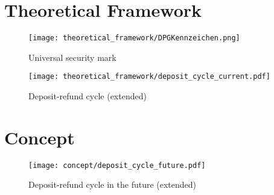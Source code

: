\begin{appendices}

\chapter{Theoretical Framework}
\label{app:theoreticalFramework}

\begin{figure}[hbt]
	\centering
  	\texttt{[image: theoretical\_framework/DPGKennzeichen.png]}
  	\caption[Universal security mark]{Universal security mark \cite{dpgKennzeichen}}
  	\label{fig:securityMark}
\end{figure}


\pagebreak

\begin{sidewaysfigure}[ht]
    \texttt{[image: theoretical\_framework/deposit\_cycle\_current.pdf]}
    \caption{Deposit-refund cycle (extended)}
	\label{fig:depositCycleCurrentExtended}
\end{sidewaysfigure}

\FloatBarrier

\chapter{Concept}
\label{app:concept}

\pagebreak

\begin{sidewaysfigure}[ht]
    \texttt{[image: concept/deposit\_cycle\_future.pdf]}
    \caption{Deposit-refund cycle in the future (extended)}
	\label{fig:depositCycleFutureExtended}
\end{sidewaysfigure}


\end{appendices}
